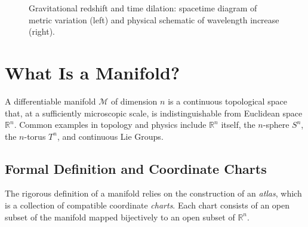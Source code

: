 \documentclass[11pt, a4paper]{report}
\begin{document}
\begin{figure}[htbp]
\begin{minipage}{0.48\textwidth}
\end{minipage}
\caption{Gravitational redshift and time dilation: spacetime diagram of metric variation (left) and physical schematic of wavelength increase (right).}
\label{fig:gravitational_redshift}
\end{figure}

\section{What Is a Manifold?}
A differentiable manifold $\mathcal{M}$ of dimension $n$ is a continuous topological space that, at a sufficiently microscopic scale, is indistinguishable from Euclidean space $\mathbb{R}^n$. Common examples in topology and physics include $\mathbb{R}^n$ itself, the $n$-sphere $S^n$, the $n$-torus $T^n$, and continuous Lie Groups. 

\subsection*{Formal Definition and Coordinate Charts}
The rigorous definition of a manifold relies on the construction of an \emph{atlas}, which is a collection of compatible coordinate \emph{charts}. Each chart consists of an open subset of the manifold mapped bijectively to an open subset of $\mathbb{R}^n$.
\end{document}
